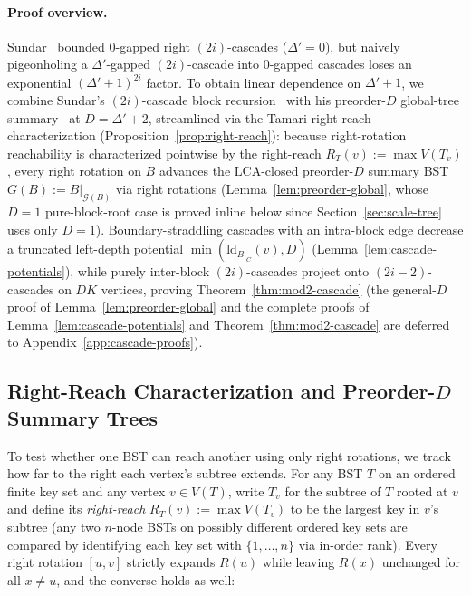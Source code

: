 \documentclass[11pt]{article}
\theoremstyle{definition}
\theoremstyle{remark}
\newcommand{\LCA}{\mathrm{LCA}}
\newcommand{\ld}{\mathrm{ld}}
\begin{document}
\paragraph{Proof overview.}
Sundar~\cite[Theorem~3]{Sundar1992} bounded $0$-gapped right $(2i)$-cascades ($\Delta' = 0$), but naively pigeonholing a $\Delta'$-gapped $(2i)$-cascade into $0$-gapped cascades loses an exponential $(\Delta' + 1)^{2i}$ factor. To obtain linear dependence on $\Delta' + 1$, we combine Sundar's $(2i)$-cascade block recursion~\cite[Section~2.1]{Sundar1992} with his preorder-$D$ global-tree summary~\cite[Section~4.2, Theorem~8]{Sundar1992} at $D = \Delta' + 2$, streamlined via the Tamari right-reach characterization (Proposition~\ref{prop:right-reach}): because right-rotation reachability is characterized pointwise by the right-reach $R_T(v) := \max V(T_v)$, every right rotation on $B$ advances the $\LCA$-closed preorder-$D$ summary BST $G(B) := B|_{\mathcal{G}(B)}$ via right rotations (Lemma~\ref{lem:preorder-global}, whose $D = 1$ pure-block-root case is proved inline below since Section~\ref{sec:scale-tree} uses only $D = 1$). Boundary-straddling cascades with an intra-block edge decrease a truncated left-depth potential $\min(\ld_{B|_C}(v), D)$ (Lemma~\ref{lem:cascade-potentials}), while purely inter-block $(2i)$-cascades project onto $(2i - 2)$-cascades on $D K$ vertices, proving Theorem~\ref{thm:mod2-cascade} (the general-$D$ proof of Lemma~\ref{lem:preorder-global} and the complete proofs of Lemma~\ref{lem:cascade-potentials} and Theorem~\ref{thm:mod2-cascade} are deferred to Appendix~\ref{app:cascade-proofs}).

\subsection{Right-Reach Characterization and Preorder-\texorpdfstring{$D$}{D} Summary Trees}
\label{subsec:right-reach}

To test whether one BST can reach another using only right rotations, we track how far to the right each vertex's subtree extends. For any BST $T$ on an ordered finite key set and any vertex $v \in V(T)$, write $T_v$ for the subtree of $T$ rooted at $v$ and define its \emph{right-reach} $R_T(v) := \max V(T_v)$ to be the largest key in $v$'s subtree (any two $n$-node BSTs on possibly different ordered key sets are compared by identifying each key set with $\{1, \dots, n\}$ via in-order rank). Every right rotation $[u, v]$ strictly expands $R(u)$ while leaving $R(x)$ unchanged for all $x \ne u$, and the converse holds as well:
\end{document}
